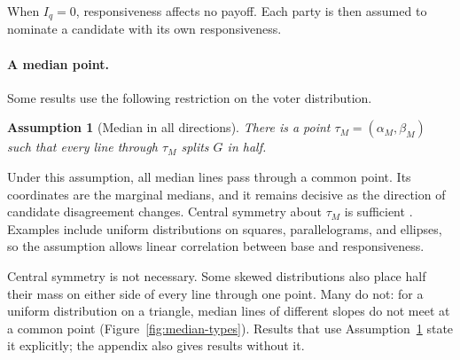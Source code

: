 \documentclass[12pt,letterpaper]{article}
\newtheorem{assumption}{Assumption}
\begin{document}
When $I_q=0$, responsiveness affects no payoff. Each party is then assumed to nominate a candidate with its own responsiveness.

\paragraph{A median point.}
Some results use the following restriction on the voter distribution.

\begin{assumption}[Median in all directions]\label{ass:median}
There is a point $\tau_M=(\alpha_M,\beta_M)$ such that every line through $\tau_M$ splits $G$ in half.
\end{assumption}

Under this assumption, all median lines pass through a common point. Its coordinates are the marginal medians, and it remains decisive as the direction of candidate disagreement changes. Central symmetry about $\tau_M$ is sufficient \citep{DavisDeGrootHinich1972}. Examples include uniform distributions on squares, parallelograms, and ellipses, so the assumption allows linear correlation between base and responsiveness.

Central symmetry is not necessary. Some skewed distributions also place half their mass on either side of every line through one point. Many do not: for a uniform distribution on a triangle, median lines of different slopes do not meet at a common point (Figure~\ref{fig:median-types}). Results that use Assumption~\ref{ass:median} state it explicitly; the appendix also gives results without it.
\end{document}
